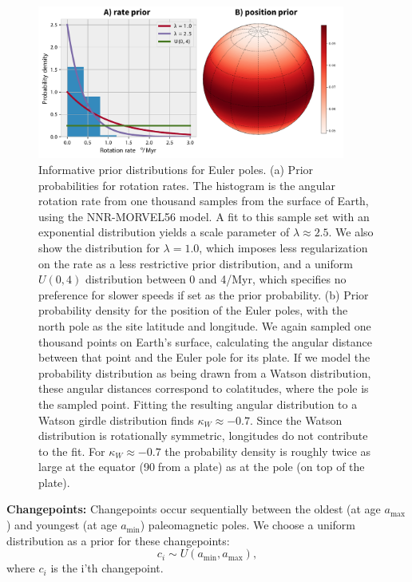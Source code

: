 \documentclass[]{agujournal2019}
\begin{document}
\begin{figure}
\centering
\includegraphics[width=0.9\textwidth]{fig_euler_pole_prior.pdf}
\caption[Informative prior distributions for Euler poles]{Informative prior distributions for Euler poles. (a) Prior probabilities for rotation rates. The histogram is the angular rotation rate from one thousand samples from the surface of Earth, using the NNR-MORVEL56 model. A fit to this sample set with an exponential distribution yields a scale parameter of $\lambda \approx 2.5$. We also show the distribution for $\lambda = 1.0$, which imposes less regularization on the rate as a less restrictive prior distribution, and a uniform $U(0,4)$ distribution between 0 and 4\textdegree/Myr, which specifies no preference for slower speeds if set as the prior probability. (b) Prior probability density for the position of the Euler poles, with the north pole as the site latitude and longitude.  We again sampled one thousand points on Earth's surface, calculating the angular distance between that point and the Euler pole for its plate.  If we model the probability distribution as being drawn from a Watson distribution, these angular distances correspond to colatitudes, where the pole is the sampled point.  Fitting the resulting angular distribution to a Watson girdle distribution finds $\kappa_W \approx -0.7$. Since the Watson distribution is rotationally symmetric, longitudes do not contribute to the fit. For $\kappa_W \approx -0.7$ the probability density is roughly twice as large at the equator (90\textdegree$\;$from a plate) as at the pole (on top of the plate).}
\label{fig:euler_pole_prior}
\end{figure}

\textbf{Changepoints:} 
Changepoints occur sequentially between the oldest (at age $a_\mathrm{max}$) and youngest (at age $a_\mathrm{min}$) paleomagnetic poles. We choose a uniform distribution as a prior for these changepoints:
\begin{equation}
c_i \sim U( a_\mathrm{min}, a_\mathrm{max}),
\end{equation}
where $c_i$ is the i'th changepoint.
\end{document}
